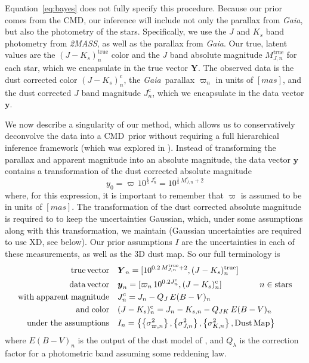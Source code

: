 \documentclass[modern]{aastex61}
\newcommand{\acronym}[1]{{\small{#1}}}
\newcommand{\project}[1]{\textsl{#1}}
\newcommand{\tmass}{\project{\acronym{2MASS}}}
\newcommand{\gaia}{\project{Gaia}}
\newcommand{\xd}{\acronym{XD}}
\newcommand{\cmd}{\acronym{CMD}}
\newcommand{\true}{\mathrm{true}}
\newcommand{\corr}{\mathrm{c}}
\renewcommand{\vec}[1]{\boldsymbol{{#1}}}
\newcommand{\truth}{\vec{Y}}
\newcommand{\data}{\vec{y}}
\begin{document}
Equation~\ref{eq:bayes} does not fully specify this procedure.
Because our prior comes from the \cmd, our inference will include not only the parallax from \gaia, but also the photometry of the stars. Specifically, we use the $J$ and $K_s$ band photometry from \tmass, as well as the parallax from \gaia. Our true, latent values are the $(J-K_s)^{\true}_n$ color and the $J$ band absolute magnitude $M^{\true}_{J,n}$ for each star, which we encapsulate in the true vector $\truth$. The observed data is the dust corrected color $(J-K_s)^{\corr}_n$, the \gaia\ parallax $\varpi_n$ in units of $[mas]$, and the dust corrected $J$ band magnitude $J^{\corr}_n$, which we encapsulate in the data vector $\data$.

We now describe a singularity of our method, which allows us to conservatively deconvolve the data into a \cmd\ prior without requiring a full hierarchical inference framework (which was explored in \citealt{leistedtHogg2017}).
Instead of transforming the parallax and apparent magnitude into an absolute magnitude, the data vector $\data$ contains a transformation of the dust corrected absolute magnitude
\begin{equation}
y_0 = \varpi\,10^{\frac{1}{5}\,J^{\corr}_n} = 10^{\frac{1}{5}\,M^{\corr}_{J,n} + 2}
\label{eq:transform}
\end{equation}
where, for this expression, it is important to remember that $\varpi$ is assumed to be in units of $[mas]$.
The transformation of the dust corrected absolute magnitude is required to to keep the uncertainties Gaussian, which, under some assumptions along with this transformation, we maintain (Gaussian uncertainties are required to use \xd, see below).
Our prior assumptions $I$ are the uncertainties in each of these measurements, as well as the 3D dust map. So our full terminology is
\begin{equation}
\begin{aligned}
\mathrm{true \, vector} \quad &\truth_n = [10^{0.2\,M^{\true}_{J,n} + 2}, (J-K_s)^{\true}_n] \\
\mathrm{data \, vector} \quad &\data_n = [\varpi_n\,10^{0.2J^{\corr}_n}, (J-K_s)^{\corr}_n] \;\hspace*{15mm}  n \in \mathrm{stars} \\
\mathrm{with \; apparent \; magnitude} \quad &J^{\corr}_n = J_n - Q_J\,E(B-V)_n \\
\mathrm{and \; color} \quad &(J-K_s)^{\corr}_n = J_n - K_{s,n} - Q_{JK}\,E(B-V)_n \\
\mathrm{under\ the\ assumptions} \quad &I_n = \left\{\left\{\sigma^2_{\varpi, n}\right\}, \left\{\sigma^2_{J,n}\right\}, \left\{\sigma^2_{K,n}\right\}, \mathrm{Dust \, Map}\right\}
\end{aligned}
\label{eq:data}
\end{equation}
where $E(B-V)_n$ is the output of the dust model of \cite{green15}, and $Q_{\lambda}$ is the correction factor for a photometric band assuming some reddening law.
\end{document}
